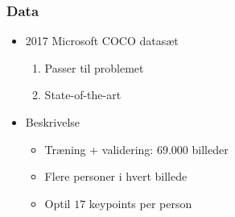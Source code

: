 \documentclass{beamer}
\begin{document}
\begin{frame}
    \frametitle{Data}
    \begin{minipage}{0.5\textwidth}
        \begin{itemize}
            \item<2-> 2017 Microsoft COCO datasæt
            \begin{enumerate}
                \item Passer til problemet
                \item State-of-the-art
            \end{enumerate}
            \item<3-> Beskrivelse
            \begin{itemize}
                \item Træning + validering: $69$.000 billeder
                \item Flere personer i hvert billede
                \item Optil $17$ keypoints per person
            \end{itemize}
        \end{itemize}
    \end{minipage}
    \begin{minipage}{0.45\textwidth}
    \end{minipage}
\end{frame}
\end{document}
